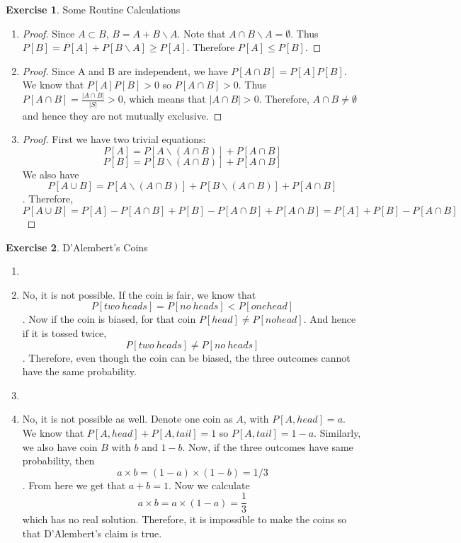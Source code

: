 \documentclass[12pt,a4paper]{article}
\makeatletter
\theoremstyle{definition}
\newtheorem{exercise}{Exercise}
\newtheorem*{solution}{Solution}
\renewenvironment{solution}[1][Solution] {\par\pushQED{\qed}\normalfont\topsep6\p@\@plus6\p@\relax\trivlist\item[\hskip\labelsep\bfseries#1\@addpunct{.}]\ignorespaces}{\popQED\endtrivlist\@endpefalse} \makeatother
\makeatother
\begin{document}
\begin{exercise}
Some Routine Calculations
\begin{enumerate}[label=\roman*)]
\item
\begin{proof}
    Since $A\subset B$, $B=A+B\backslash A$. Note that $A \cap B \backslash A = \emptyset $. Thus $P[B]=P[A]+P[B\backslash A]\geq P[A]$. Therefore $P[A]\leq P[B]$.
\end{proof}
\item
\begin{proof}
    Since A and B are independent, we have $P[A\cap B]=P[A]P[B]$. We know that $P[A]P[B]>0$ so $P[A\cap B]>0$. Thus $P[A\cap B]=\frac{|A\cap B|}{|S|}>0$, which means that $|A\cap B|> 0$. Therefore, $A\cap B\neq \emptyset$ and hence they are not mutually exclusive.
\end{proof}
\item
\begin{proof}
    First we have two trivial equations:
    $$P[A]=P[A\backslash (A\cap B)]+P[A\cap B]$$
    $$P[B]=P[B\backslash (A\cap B)]+P[A\cap B]$$
    We also have
    $$P[A\cup B]=P[A\backslash (A\cap B)]+P[B\backslash (A\cap B)]+P[A\cap B]$$.
    Therefore,
    $$P[A\cup B]=P[A]-P[A\cap B]+P[B]-P[A\cap B]+P[A\cap B]=P[A]+P[B]-P[A\cap B]$$
\end{proof}
\end{enumerate}
\end{exercise}
\begin{exercise}
    D'Alembert's Coins
    \begin{enumerate}[label=\roman*)]
        \item
        \begin{solution}
            No, it is not possible. If the coin is fair, we know that $$P[two\ heads]=P[no \ heads] < P[one head]$$. Now if the coin is biased, for that coin $P[head]\neq P[no head]$. And hence if it is tossed twice, $$P[two \ heads]\neq P[no \ heads]$$. Therefore, even though the coin can be biased, the three outcomes cannot have the same probability.
        \end{solution}
        \item 
        \begin{solution}
            No, it is not possible as well. Denote one coin as $A$, with $P[A,head]=a$. We know that $P[A,head]+P[A,tail]=1$ so $P[A,tail]=1-a$. Similarly, we also have coin $B$ with $b$ and $1-b$. Now, if the three outcomes have same probability, then $$a\times b=(1-a)\times (1-b)=1/3$$. From here we get that $a+b=1$. Now we calculate $$a\times b=a\times (1-a)=\frac{1}{3}$$ which has no real solution. Therefore, it is impossible to make the coins so that D'Alembert's claim is true.
        \end{solution}
    \end{enumerate}
\end{exercise}
\end{document}
